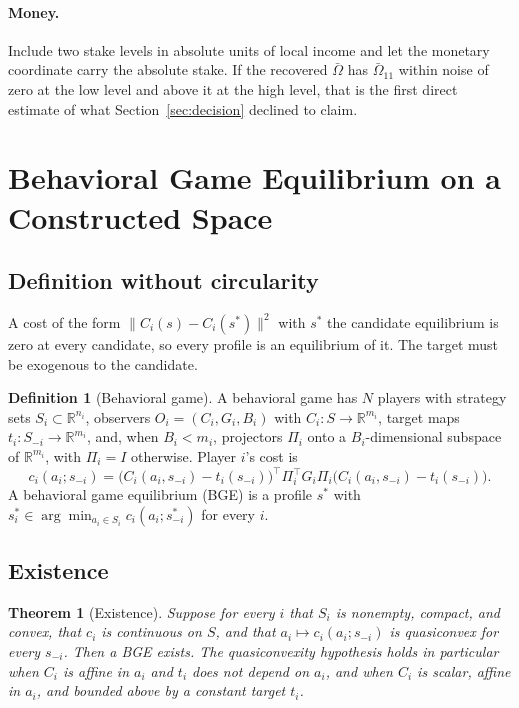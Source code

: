 \documentclass[11pt]{article}
\newtheorem{theorem}{Theorem}
\theoremstyle{definition}
\newtheorem{definition}{Definition}
\theoremstyle{remark}
\newcommand{\R}{\mathbb{R}}
\begin{document}
\paragraph{Money.}
Include two stake levels in absolute units of local income and let the monetary coordinate carry the absolute stake.
If the recovered $\bar{\Omega}$ has $\bar{\Omega}_{11}$ within noise of zero at the low level and above it at the high level, that is the first direct estimate of what Section~\ref{sec:decision} declined to claim.

\section{Behavioral Game Equilibrium on a Constructed Space}
\label{sec:bge}

\subsection{Definition without circularity}

A cost of the form $\|C_{i}(s)-C_{i}(s^{*})\|^{2}$ with $s^{*}$ the candidate equilibrium is zero at every candidate, so every profile is an equilibrium of it.
The target must be exogenous to the candidate.

\begin{definition}[Behavioral game]
\label{def:bg}
A behavioral game has $N$ players with strategy sets $S_{i}\subset\R^{n_{i}}$, observers $O_{i}=(C_{i},G_{i},B_{i})$ with $C_{i}:S\to\R^{m_{i}}$, target maps $t_{i}:S_{-i}\to\R^{m_{i}}$, and, when $B_{i}<m_{i}$, projectors $\Pi_{i}$ onto a $B_{i}$-dimensional subspace of $\R^{m_{i}}$, with $\Pi_{i}=I$ otherwise. Player $i$'s cost is
\begin{equation}
c_{i}(a_{i};s_{-i})=\bigl(C_{i}(a_{i},s_{-i})-t_{i}(s_{-i})\bigr)^{\top}\Pi_{i}^{\top}G_{i}\Pi_{i}\bigl(C_{i}(a_{i},s_{-i})-t_{i}(s_{-i})\bigr).
\label{eq:bgcost}
\end{equation}
A behavioral game equilibrium (BGE) is a profile $s^{*}$ with $s_{i}^{*}\in\arg\min_{a_{i}\in S_{i}}c_{i}(a_{i};s_{-i}^{*})$ for every $i$.
\end{definition}

\subsection{Existence}

\begin{theorem}[Existence]
\label{thm:exist}
Suppose for every $i$ that $S_{i}$ is nonempty, compact, and convex, that $c_{i}$ is continuous on $S$, and that $a_{i}\mapsto c_{i}(a_{i};s_{-i})$ is quasiconvex for every $s_{-i}$. Then a BGE exists. The quasiconvexity hypothesis holds in particular when $C_{i}$ is affine in $a_{i}$ and $t_{i}$ does not depend on $a_{i}$, and when $C_{i}$ is scalar, affine in $a_{i}$, and bounded above by a constant target $t_{i}$.
\end{theorem}
\end{document}
